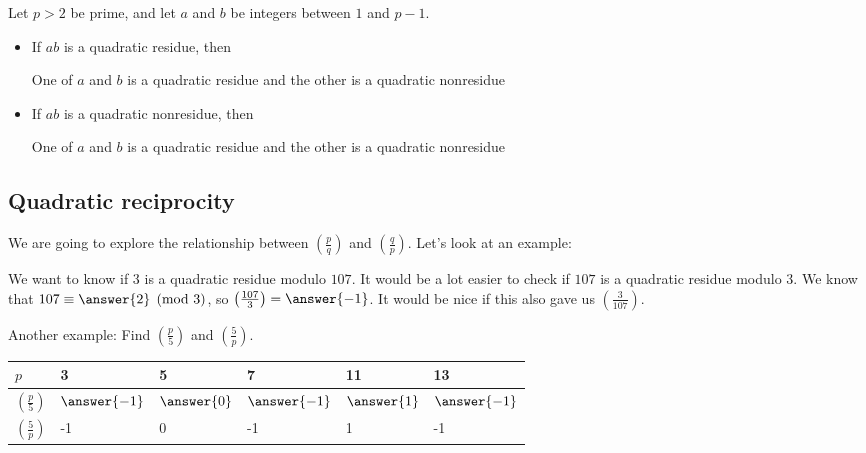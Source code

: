 \documentclass{ximera}
\theoremstyle{plain}
\begin{document}
\begin{question}
Let $p>2$ be prime, and let $a$ and $b$ be integers between $1$ and $p-1$.
\begin{itemize}
\item If $ab$ is a quadratic residue, then
\begin{selectAll}
\choice
{One of $a$ and $b$ is a quadratic residue and the other is a quadratic nonresidue}
\end{selectAll}
 \item If $ab$ is a quadratic nonresidue, then
\begin{selectAll}
\choice
{One of $a$ and $b$ is a quadratic residue and the other is a quadratic nonresidue}
\end{selectAll}
\end{itemize}
 
\end{question}


\subsection{Quadratic reciprocity}
We are going to explore the relationship between $\left(\frac{p}{q}\right)$ and $\left(\frac{q}{p}\right)$. Let's look at an example:
\begin{question}
 We want to know if $3$ is a quadratic residue modulo $107$. It would be a lot easier to check if $107$ is a quadratic residue modulo $3$. We know that $107\equiv \answer{2}
 \pmod 3$, so $\left(\frac{107}{3}\right)=\answer{-1}
 $. It would be nice if this also gave us $\left(\frac{3}{107}\right)$.
\end{question}

\begin{question}
 Another example: Find $\left(\frac{p}{5}\right)$ and $\left(\frac{5}{p}\right)$.
 
\begin{tabular}{|l||l|l|l|l|l|}\hline
$p$&3&5&7&11&13\\\hline\hline
$\left(\frac{p}{5}\right)$&$\answer{-1}$&$\answer{0}$&$\answer{-1}$&$\answer{1}$&$\answer{-1}$\\\hline
$\left(\frac{5}{p}\right)$&-1&0&-1&1&-1\\\hline
\end{tabular}
\end{question}
\end{document}
